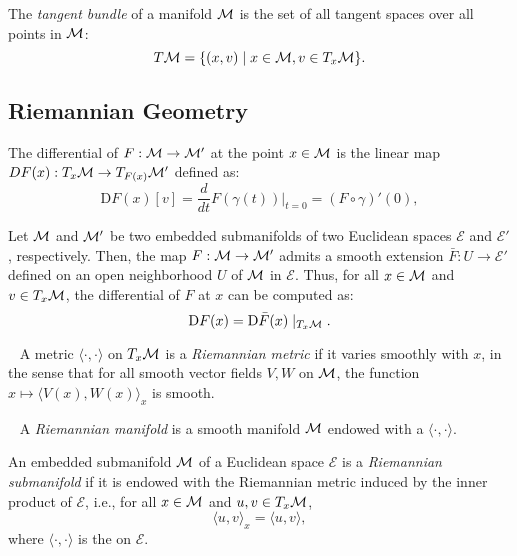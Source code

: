 \begin{definition}
    The \textit{tangent bundle} of a manifold $\mathcal{M}$ is the set of all tangent spaces over all points in $\mathcal{M}$:
    \[
        T\mathcal{M} = \{ (x,v) \mid x \in \mathcal{M}, v \in T_x \mathcal{M} \}.
    \]
\end{definition}

\subsection{Riemannian Geometry}
\begin{definition}[Differential]
    The differential of $F: \mathcal{M} \to \mathcal{M}'$ at the point $x \in \mathcal{M}$ is the linear map $DF(x) : T_x \mathcal{M} \to T_{F(x)} \mathcal{M}'$ defined as:
    \[
        \textrm{D}F(x)[v] = \frac{d}{dt} F(\gamma(t)) \Big|_{t = 0} = (F \circ \gamma)'(0),
    \]
    
    Let $\mathcal{M}$ and $\mathcal{M}'$ be two embedded submanifolds of two Euclidean spaces $\mathcal{E}$ and $\mathcal{E}'$, respectively. Then, the map $F : \mathcal{M} \to \mathcal{M}'$ admits a smooth extension $\bar{F} : U \to \mathcal{E}'$ defined on an open neighborhood $U$ of $\mathcal{M}$ in $\mathcal{E}$. Thus, for all $x \in \mathcal{M}$ and $v \in T_x \mathcal{M}$, the differential of $F$ at $x$ can be computed as:
    \[
        \textrm{D}F(x) = \textrm{D}\bar{F}(x) \mid_{T_x \mathcal{M}}.
    \]
\end{definition}

\begin{definition}~\label{def:riem-metric}
    A metric $\langle \cdot, \cdot \rangle$ on $T_x \mathcal{M}$ is a \textit{Riemannian metric} if it varies smoothly with $x$, in the sense that for all smooth vector fields $V,W$ on $\mathcal{M}$, the function $x \mapsto \langle V(x), W(x) \rangle_x$ is smooth.
\end{definition}

\begin{definition}~\label{def:riem-manifold}
    A \textit{Riemannian manifold} is a smooth manifold $\mathcal{M}$ endowed with a  $\langle \cdot, \cdot \rangle$.
    
\end{definition}

\begin{definition}
    An embedded submanifold $\mathcal{M}$ of a Euclidean space $\mathcal{E}$ is a \textit{Riemannian submanifold} if it is endowed with the Riemannian metric induced by the inner product of $\mathcal{E}$, i.e., for all $x \in \mathcal{M}$ and $u,v \in T_x \mathcal{M}$,
    \[
        \langle u, v \rangle_x = \langle u, v \rangle,
    \]
    where $\langle \cdot, \cdot \rangle$ is the  on $\mathcal{E}$.
    
\end{definition}

